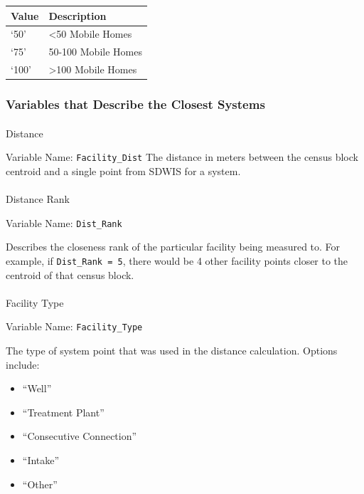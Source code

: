 \documentclass[12pt]{article}
\makeatletter
\providecommand{\tightlist}{%
  \setlength{\itemsep}{0pt}\setlength{\parskip}{0pt}}
\let\oldparagraph\paragraph
\renewcommand{\paragraph}{
    \@ifstar
      \xxxParagraphStar
      \xxxParagraphNoStar
  }
\newcommand{\xxxParagraphStar}[1]{\oldparagraph*{#1}\mbox{}}
\newcommand{\xxxParagraphNoStar}[1]{\oldparagraph{#1}\mbox{}}
\makeatother
\begin{document}
\begin{longtable}[]{@{}ll@{}}
\toprule\noalign{}
Value & Description \\
\midrule\noalign{}
\endhead
\bottomrule\noalign{}
\endlastfoot
`50' & \textless50 Mobile Homes \\
`75' & 50-100 Mobile Homes \\
`100' & \textgreater100 Mobile Homes \\
\end{longtable}

\subsubsection{Variables that Describe the Closest
Systems}\label{variables-that-describe-the-closest-systems}

\paragraph{Distance}\label{distance}

Variable Name: \texttt{Facility\_Dist} The distance in meters between
the census block centroid and a single point from SDWIS for a system.

\paragraph{Distance Rank}\label{distance-rank}

Variable Name: \texttt{Dist\_Rank}

Describes the closeness rank of the particular facility being measured
to. For example, if \texttt{Dist\_Rank\ =\ 5}, there would be 4 other
facility points closer to the centroid of that census block.

\paragraph{Facility Type}\label{facility-type}

Variable Name: \texttt{Facility\_Type}

The type of system point that was used in the distance calculation.
Options include:

\begin{itemize}
\tightlist
\item
  ``Well''
\item
  ``Treatment Plant''
\item
  ``Consecutive Connection''
\item
  ``Intake''
\item
  ``Other''
\end{itemize}
\end{document}
